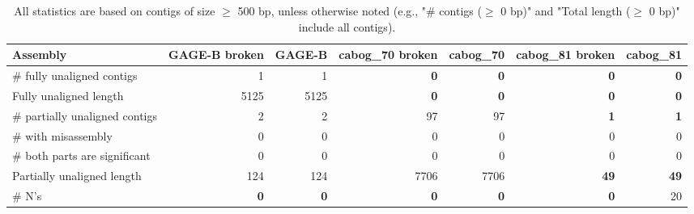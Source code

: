 \documentclass[12pt,a4paper]{article}
\begin{document}
\begin{table}[ht]
\begin{center}
\caption{All statistics are based on contigs of size $\geq$ 500 bp, unless otherwise noted (e.g., "\# contigs ($\geq$ 0 bp)" and "Total length ($\geq$ 0 bp)" include all contigs).}
\begin{tabular}{|l*{6}{|r}|}
\hline
Assembly & GAGE-B broken & GAGE-B & cabog\_70 broken & cabog\_70 & cabog\_81 broken & cabog\_81 \\ \hline
\# fully unaligned contigs & 1 & 1 & {\bf 0} & {\bf 0} & {\bf 0} & {\bf 0} \\ \hline
Fully unaligned length & 5125 & 5125 & {\bf 0} & {\bf 0} & {\bf 0} & {\bf 0} \\ \hline
\# partially unaligned contigs & 2 & 2 & 97 & 97 & {\bf 1} & {\bf 1} \\ \hline
\hspace{5mm}\# with misassembly & 0 & 0 & 0 & 0 & 0 & 0 \\ \hline
\hspace{5mm}\# both parts are significant & 0 & 0 & 0 & 0 & 0 & 0 \\ \hline
Partially unaligned length & 124 & 124 & 7706 & 7706 & {\bf 49} & {\bf 49} \\ \hline
\# N's & {\bf 0} & {\bf 0} & {\bf 0} & {\bf 0} & {\bf 0} & 20 \\ \hline
\end{tabular}
\end{center}
\end{table}
\end{document}
